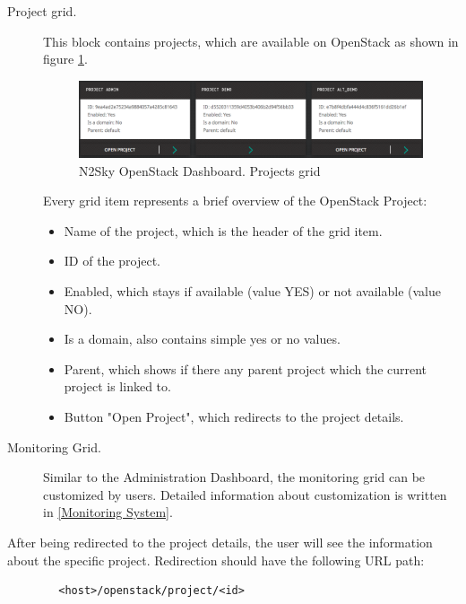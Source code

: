 \begin{description}
\item[Project grid.] This block contains projects, which are available on OpenStack as shown in figure \ref{fig:openstack_dashboard_projects}.

\begin{figure}[H]
\begin{center}
  \includegraphics[width=\linewidth]{components/4/pics/openstack_dashboard_projects.png}
  \caption{N2Sky OpenStack Dashboard. Projects grid}
  \label{fig:openstack_dashboard_projects}
\end{center}
\end{figure}

Every grid item represents a brief overview of the OpenStack Project:

\begin{itemize}
\item Name of the project, which is the header of the grid item.
\item ID of the project.
\item Enabled, which stays if available (value YES) or not available (value NO).
\item Is a domain, also contains simple yes or no values.
\item Parent, which shows if there any parent project which the current project is linked to.
\item Button "Open Project", which redirects to the project details.
\end{itemize}

\item[Monitoring Grid.] Similar to the Administration Dashboard, the monitoring grid can be customized by users. Detailed information about customization is written in \autoref{Monitoring System}. 

\end{description}

After being redirected to the project details, the user will see the information about the specific project. Redirection should have the following URL path: 
\begin{lstlisting}
        <host>/openstack/project/<id>
\end{lstlisting}

